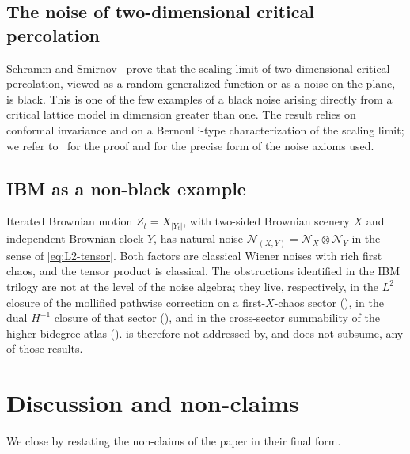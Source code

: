 \documentclass[11pt,reqno]{amsart}
\theoremstyle{plain}
\theoremstyle{definition}
\theoremstyle{remark}
\newcommand{\IBM}{Z}
\begin{document}
\subsection{The noise of two-dimensional critical percolation}\label{sec:ex-percolation}

Schramm and Smirnov~\cite{SchrammSmirnov2011} prove that the scaling
limit of two-dimensional critical percolation, viewed as a random
generalized function or as a noise on the plane, is black. This is
one of the few examples of a black noise arising directly from a
critical lattice model in dimension greater than one. The result
relies on conformal invariance and on a Bernoulli-type
characterization of the scaling limit; we refer
to~\cite{SchrammSmirnov2011} for the proof and for the precise form
of the noise axioms used.

\subsection{IBM as a non-black example}\label{sec:ex-ibm}

Iterated Brownian motion $\IBM_t=X_{|Y_t|}$, with two-sided Brownian
scenery $X$ and independent Brownian clock $Y$, has natural noise
$\mathcal N_{(X,Y)}=\mathcal N_X\otimes\mathcal N_Y$ in the sense of
\eqref{eq:L2-tensor}. Both factors are classical Wiener noises with
rich first chaos, and the tensor product is classical. The
obstructions identified in the IBM trilogy
\cite{EnergyFirst,FCDC,BidegreeAtlas} are not at the level of the
noise algebra; they live, respectively, in the $L^2$ closure of the
mollified pathwise correction on a first-$X$-chaos sector
(\cite{EnergyFirst}), in the dual $H^{-1}$ closure of that sector
(\cite{FCDC}), and in the cross-sector summability of the higher
bidegree atlas (\cite{BidegreeAtlas}).  is therefore
not addressed by, and does not subsume, any of those results.

\section{Discussion and non-claims}\label{sec:discussion}

We close by restating the non-claims of the paper in their final form.
\end{document}
